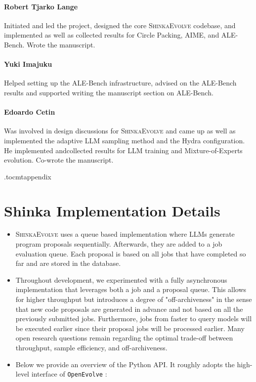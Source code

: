 \documentclass[11pt, a4paper]{include/gdm_format}
\newcommand{\ouralgo}{\textsc{ShinkaEvolve}\xspace}
\begin{document}
\paragraph{Robert Tjarko Lange} Initiated and led the project, designed the core \ouralgo codebase, and implemented as well as collected results for Circle Packing, AIME, and ALE-Bench. Wrote the manuscript.
\paragraph{Yuki Imajuku} Helped setting up the ALE-Bench infrastructure, advised on the ALE-Bench results and supported writing the manuscript section on ALE-Bench.
\paragraph{Edoardo Cetin} Was involved in design discussions for \ouralgo and came up as well as implemented the adaptive LLM sampling method and the Hydra configuration. He implemented andcollected results for LLM training and Mixture-of-Experts evolution. Co-wrote the manuscript.

\newpage



\clearpage
\appendix

\etocdepthtag.toc{mtappendix}
\renewcommand{\contentsname}{Appendix}
\tableofcontents

\newpage

\section{Shinka Implementation Details}
\label{appsec:shinka_code}

\begin{itemize}
  \item \ouralgo uses a queue based implementation where LLMs generate program proposals sequentially. Afterwards, they are added to a job evaluation queue. Each proposal is based on all jobs that have completed so far and are stored in the database.
  \item Throughout development, we experimented with a fully asynchronous implementation that leverages both a job and a proposal queue. This allows for higher throughput but introduces a degree of "off-archiveness" in the sense that new code proposals are generated in advance and not based on all the previously submitted jobs. Furthermore, jobs from faster to query models will be executed earlier since their proposal jobs will be processed earlier. Many open research questions remain regarding the optimal trade-off between throughput, sample efficiency, and off-archiveness.
  \item Below we provide an overview of the Python API. It roughly adopts the high-level interface of \texttt{OpenEvolve} \citep{openevolve}:
\end{itemize}
\end{document}
